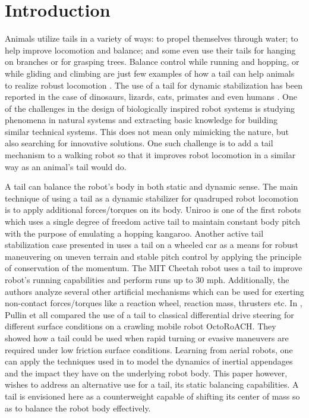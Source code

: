 \section{Introduction}\label{sec:introduction}

Animals utilize tails in a variety of ways: to propel themselves through water; to help improve locomotion and balance; and some even use their tails for hanging on branches or for grasping trees. Balance control while running and hopping, or while gliding and climbing are just few examples of how a tail can help animals to realize robust locomotion \cite{Thomas:Nature2012}. The use of a tail for dynamic stabilization has been reported in the case of dinosaurs, lizards, cats, primates and even humans \cite{ostrom1969osteology,PijnappelsSringer,Walker199841,JusufiIOP2010}. One of the challenges in the design of biologically inspired robot systems is studying phenomena in natural systems and extracting basic knowledge for building similar technical systems. This does not mean only mimicking the nature, but also searching for innovative solutions. One such challenge is to add a tail mechanism to a walking robot so that it improves robot locomotion in a similar way as an animal's tail would do. 
 
A tail can balance the robot's body in both static and dynamic sense. The main technique of using a tail as a dynamic stabilizer for quadruped robot locomotion is to apply additional forces/torques on its body. Uniroo \cite{zeglin1991uniroo} is one of the first robots which uses a single degree of freedom active tail to maintain constant body pitch with the purpose of emulating a hopping kangaroo. Another active tail stabilization case presented in \cite{conf/iros/Chang-SiuLTF11} uses a tail on a wheeled car as a means for robust maneuvering on uneven terrain and stable pitch control by applying the principle of conservation of the momentum. The MIT Cheetah robot \cite{DBLP:conf/iros/BriggsLHK12} uses a tail to improve robot's running capabilities and perform runs up to 30 mph. Additionally, the authors analyze several other artificial mechanisms which can be used for exerting non-contact forces/torques like a reaction wheel, reaction mass, thrusters etc. In \cite{PullinICRA12}, Pullin et all compared the use of a tail to classical differential drive steering for different surface conditions on a crawling mobile robot OctoRoACH. They showed how a tail could be used when rapid turning or evasive maneuvers are required under low friction surface conditions. Learning from aerial robots, one can apply the techniques used in \cite{Korpela2013ICRA,Orsag2012JINT} to model the dynamics of inertial appendages and the impact they have on the underlying robot body. This paper however, wishes to address an alternative use for a tail, its static balancing capabilities. A tail is envisioned here as a counterweight capable of shifting its center of mass so as to balance the robot body effectively.
 

